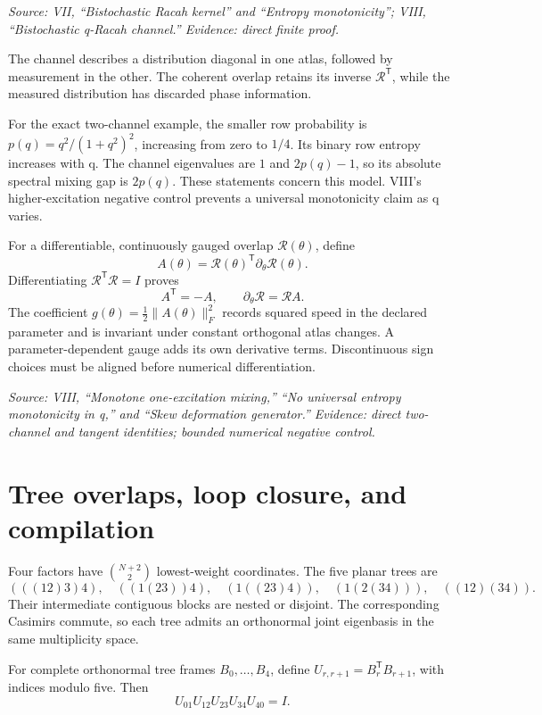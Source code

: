 \noindent\emph{Source: VII, ``Bistochastic Racah kernel'' and ``Entropy monotonicity''; VIII, ``Bistochastic q-Racah channel.'' Evidence: direct finite proof.}

The channel describes a distribution diagonal in one atlas, followed by measurement in the other. The coherent overlap retains its inverse $\mathcal R^{\mathsf T}$, while the measured distribution has discarded phase information.

For the exact two-channel example, the smaller row probability is $p(q)=q^2/(1+q^2)^2$, increasing from zero to $1/4$. Its binary row entropy increases with q. The channel eigenvalues are $1$ and $2p(q)-1$, so its absolute spectral mixing gap is $2p(q)$. These statements concern this model. VIII's higher-excitation negative control prevents a universal monotonicity claim as q varies.

For a differentiable, continuously gauged overlap $\mathcal R(\theta)$, define
\[
A(\theta)=\mathcal R(\theta)^{\mathsf T}\partial_\theta\mathcal R(\theta).
\]
Differentiating $\mathcal R^{\mathsf T}\mathcal R=I$ proves
\[
A^{\mathsf T}=-A,\qquad
\partial_\theta\mathcal R=\mathcal R A.
\]
The coefficient $g(\theta)=\tfrac12\|A(\theta)\|_F^2$ records squared speed in the declared parameter and is invariant under constant orthogonal atlas changes. A parameter-dependent gauge adds its own derivative terms. Discontinuous sign choices must be aligned before numerical differentiation.

\noindent\emph{Source: VIII, ``Monotone one-excitation mixing,'' ``No universal entropy monotonicity in q,'' and ``Skew deformation generator.'' Evidence: direct two-channel and tangent identities; bounded numerical negative control.}

\section{Tree overlaps, loop closure, and compilation}

Four factors have $\binom{N+2}{2}$ lowest-weight coordinates. The five planar trees are
\[
(((12)3)4),\quad((1(23))4),\quad(1((23)4)),
\quad(1(2(34))),\quad((12)(34)).
\]
Their intermediate contiguous blocks are nested or disjoint. The corresponding Casimirs commute, so each tree admits an orthonormal joint eigenbasis in the same multiplicity space.

\begin{theorem}
For complete orthonormal tree frames $B_0,\ldots,B_4$, define $U_{r,r+1}=B_r^{\mathsf T}B_{r+1}$, with indices modulo five. Then
\[
U_{01}U_{12}U_{23}U_{34}U_{40}=I.
\]
\end{theorem}

